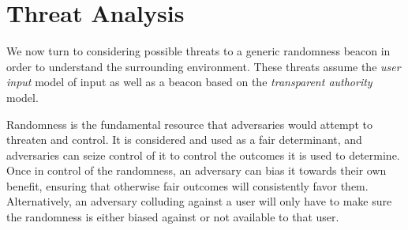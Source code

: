 \section{Threat Analysis}
We now turn to considering possible threats to a generic randomness beacon in order to understand the surrounding environment.
These threats assume the \emph{user input} model of input as well as a beacon based on the \emph{transparent authority} model.

Randomness is the fundamental resource that adversaries would attempt to threaten and control. It is considered and used as a fair determinant, and adversaries can seize control of it to control the outcomes it is used to determine. Once in control of the randomness, an adversary can bias it towards their own benefit, ensuring that otherwise fair outcomes will consistently favor them. Alternatively, an adversary colluding against a user will only have to make sure the randomness is either biased against or not available to that user.
